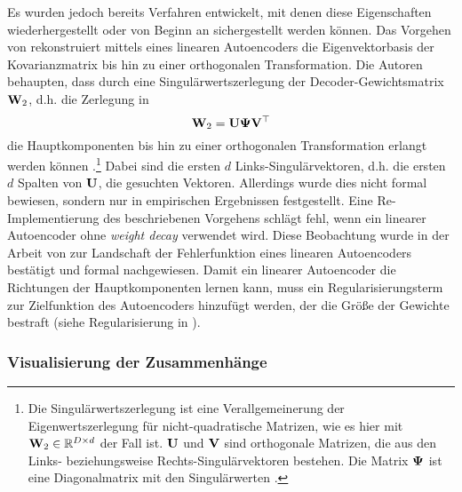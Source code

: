 Es wurden jedoch bereits Verfahren entwickelt, mit denen diese Eigenschaften wiederhergestellt oder
von Beginn an sichergestellt werden können. Das Vorgehen von \textcite{Plaut.2018} rekonstruiert
mittels eines linearen Autoencoders die Eigenvektorbasis der Kovarianzmatrix bis hin zu einer
orthogonalen Transformation. Die Autoren behaupten, dass durch eine Singulärwertszerlegung der
Decoder-Gewichtsmatrix $\mathbf{W}_2$, d.h. die Zerlegung in
\begin{equation}
	\label{eq:SVD}
	\mathbf{W}_2 = \mathbf{U} \mathbf{\Psi} \mathbf{V}^\top
\end{equation}
die Hauptkomponenten bis hin zu einer orthogonalen Transformation erlangt werden können \parencite[4]{Plaut.2018}.\footnote{Die Singulärwertszerlegung ist eine Verallgemeinerung der
	Eigenwertszerlegung für nicht-quadratische Matrizen, wie es hier mit $\mathbf{W}_2 \in \mathbb{R}^{D \times
			d}$ der Fall ist. $\mathbf{U}$ und $\mathbf{V}$ sind orthogonale Matrizen, die aus den Links-
	beziehungsweise Rechts-Singulärvektoren bestehen. Die Matrix $\mathbf{\Psi}$ ist eine Diagonalmatrix
	mit den Singulärwerten \parencite[44 -- 45]{Goodfellow.2016}. } Dabei sind die ersten $d$ Links-Singulärvektoren, d.h. die
ersten $d$ Spalten von $\mathbf{U}$, die gesuchten Vektoren. Allerdings wurde dies nicht formal
bewiesen, sondern nur in empirischen Ergebnissen festgestellt. Eine Re-Implementierung des
beschriebenen Vorgehens schlägt fehl, wenn ein linearer Autoencoder ohne \textit{weight decay}
verwendet wird. Diese Beobachtung wurde in der Arbeit von \textcite{Kunin.2019} zur Landschaft der
Fehlerfunktion eines linearen Autoencoders bestätigt und formal nachgewiesen. Damit ein linearer
Autoencoder die Richtungen der Hauptkomponenten lernen kann, muss ein Regularisierungsterm zur
Zielfunktion des Autoencoders hinzufügt werden, der die Größe der Gewichte bestraft (siehe
Regularisierung in ).

\subsubsection{Visualisierung der Zusammenhänge}

